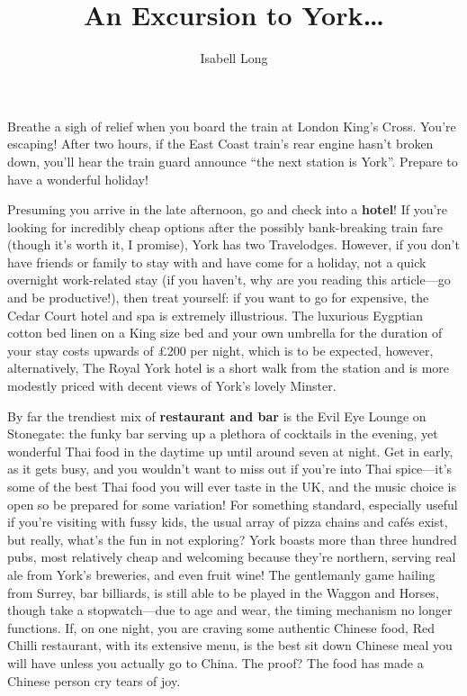 \documentclass[11pt,a4paper]{article}
\begin{document}
\title{An Excursion to York\ldots}
\author{Isabell Long}
\maketitle

Breathe a sigh of relief when you board the train at London King's Cross.  You're escaping!  After two hours, if the East Coast train's rear engine hasn't broken down, you'll hear the train guard announce ``the next station is York''.  Prepare to have a wonderful holiday!  

Presuming you arrive in the late afternoon, go and check into a \textbf{hotel}!  If you're looking for incredibly cheap options after the possibly bank-breaking train fare (though it's worth it, I promise), York has two Travelodges.  However, if you don't have friends or family to stay with and have come for a holiday, not a quick overnight work-related stay (if you haven't, why are you reading this article---go and be productive!), then treat yourself: if you want to go for expensive, the Cedar Court hotel and spa is extremely illustrious.  The luxurious Eygptian cotton bed linen on a King size bed and your own umbrella for the duration of your stay costs upwards of \pounds200 per night, which is to be expected, however, alternatively, The Royal York hotel is a short walk from the station and is more modestly priced with decent views of York's lovely Minster.

By far the trendiest mix of \textbf{restaurant and bar} is the Evil Eye Lounge on
Stonegate: the funky bar serving up a plethora of cocktails in the
evening, yet wonderful Thai food in the daytime up until around seven at
night.  Get in early, as it gets busy, and you wouldn't want to miss out
if you're into Thai spice---it's some of the best Thai food you will ever
taste in the UK, and the music choice is open so be prepared for some variation!  For something standard, especially useful if you're visiting with fussy kids, the usual array of pizza chains and caf\'es exist, but really, what's the fun in not exploring?  York boasts more than three hundred pubs, most relatively cheap and welcoming because they're northern, serving real ale from York's breweries, and even fruit wine!  The gentlemanly game hailing from Surrey, bar billiards, is still able to be played in the Waggon and Horses, though take a stopwatch---due to age and wear, the timing mechanism no longer functions.  If, on one night, you are craving some authentic Chinese food, Red Chilli restaurant, with its extensive menu, is the best sit down Chinese meal you will have unless you actually go to China.  The proof?  The food has made a Chinese person cry tears of joy.
\end{document}
